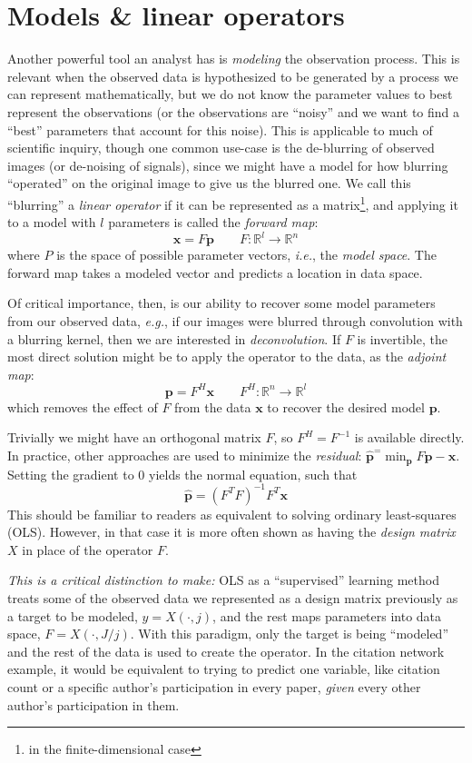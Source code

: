 \documentclass[%
	12pt,
		oneside,
		letterpaper
]{book}
\begin{document}
\section{Models \& linear operators}\label{sec-lin-ops}

Another powerful tool an analyst has is \emph{modeling} the observation
process. This is relevant when the observed data is hypothesized to be
generated by a process we can represent mathematically, but we do not
know the parameter values to best represent the observations (or the
observations are ``noisy'' and we want to find a ``best'' parameters
that account for this noise). This is applicable to much of scientific
inquiry, though one common use-case is the de-blurring of observed
images (or de-noising of signals), since we might have a model for how
blurring ``operated'' on the original image to give us the blurred one.
We call this ``blurring'' a \emph{linear operator} if it can be
represented as a matrix\footnote{in the finite-dimensional case}, and
applying it to a model with \(l\) parameters is called the \emph{forward
map}:
\[\mathbf{x} = F\mathbf{p}\qquad F:\mathbb{R}^{l}\rightarrow \mathbb{R}^n\]
where \(P\) is the space of possible parameter vectors, \emph{i.e.}, the
\emph{model space}. The forward map takes a modeled vector and predicts
a location in data space.

Of critical importance, then, is our ability to recover some model
parameters from our observed data, \emph{e.g.}, if our images were
blurred through convolution with a blurring kernel, then we are
interested in \emph{deconvolution}. If \(F\) is invertible, the most
direct solution might be to apply the operator to the data, as the
\emph{adjoint map}:
\[ \mathbf{p} = F^H\mathbf{x}\qquad F^H:\mathbb{R}^{n}\rightarrow \mathbb{R}^l\]
which removes the effect of \(F\) from the data \(\mathbf{x}\) to
recover the desired model \(\mathbf{p}\).

Trivially we might have an orthogonal matrix \(F\), so \(F^H=F^{-1}\) is
available directly. In practice, other approaches are used to minimize
the \emph{residual}:
\(\hat{\mathbf{p}}^=\min_{\mathbf{p}} F\mathbf{p}-\mathbf{x}\). Setting
the gradient to 0 yields the normal equation, such that
\[ \hat{\mathbf{p}}=(F^TF)^{-1}F^T\mathbf{x}\] This should be familiar
to readers as equivalent to solving ordinary least-squares (OLS).
However, in that case it is more often shown as having the \emph{design
matrix} \(X\) in place of the operator \(F\).

\emph{This is a critical distinction to make:} OLS as a ``supervised''
learning method treats some of the observed data we represented as a
design matrix previously as a target to be modeled, \(y=X(\cdot,j)\),
and the rest maps parameters into data space, \(F=X(\cdot,J/j)\). With
this paradigm, only the target is being ``modeled'' and the rest of the
data is used to create the operator. In the citation network example, it
would be equivalent to trying to predict one variable, like citation
count or a specific author's participation in every paper, \emph{given}
every other author's participation in them.
\end{document}
